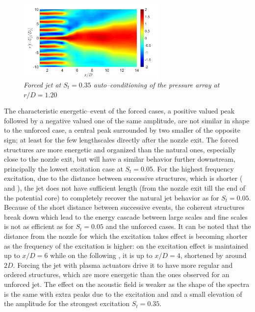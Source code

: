 \begin{figure}
	\centering
	\includegraphics[width=0.65\textwidth]{Figures/conditioning/autoCondSt0p35.png}
	\caption{\textit{Forced jet at $S_t = 0.35$ auto--conditioning of the pressure array at $r/D = 1.20$}}
	\label{fig:autoCondSt0p35}
\end{figure}
The characteristic energetic--event of the forced cases, a positive valued peak followed by a negative valued one of the same amplitude, are not similar in shape to the unforced case, a central peak surrounded by two smaller of the opposite sign; at least for the few lengthscales directly after the nozzle exit.
The forced structures are more energetic and organized than the natural ones, especially close to the nozzle exit, but will have a similar behavior further downstream, principally the lowest excitation case at $S_t = 0.05$.
For the highest frequency excitation, due to the distance between successive structures, which is shorter ( and ), the jet does not have sufficient length (from the nozzle exit till the end of the potential core) to completely recover the natural jet behavior as for $S_t = 0.05$.
Because of the short distance between successive events, the coherent structures break down which lead to the energy cascade between large scales and fine scales is not as efficient as for $S_t = 0.05$ and the unforced cases.
It can be noted that the distance from the nozzle for which the excitation takes effect is becoming shorter as the frequency of the excitation is higher: on  the excitation effect is maintained up to $x/D=6$ while on the following , it is up to $x/D=4$, shortened by around $2D$.
Forcing the jet with plasma actuators drive it to have more regular and ordered structures, which are more energetic than the ones observed for an unforced jet. The effect on the acoustic field is weaker as the shape of the spectra is the same  with extra peaks due to the excitation and and a small elevation of the amplitude for the strongest excitation $S_t = 0.35$.

